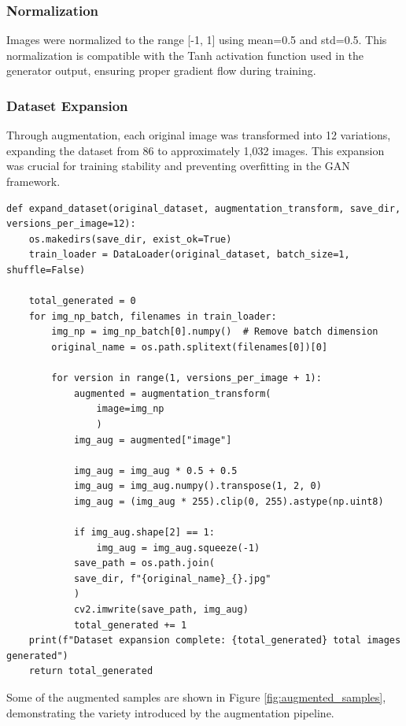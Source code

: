 \documentclass[a4paper, journal]{IEEEtran}
\begin{document}
\subsubsection{Normalization}
Images were normalized to the range [-1, 1] using mean=0.5 and std=0.5. This normalization is compatible with the Tanh activation function used in the generator output, ensuring proper gradient flow during training.

\subsubsection{Dataset Expansion}
Through augmentation, each original image was transformed into 12 variations, expanding the dataset from 86 to approximately 1,032 images. This expansion was crucial for training stability and preventing overfitting in the GAN framework.

\begin{lstlisting}[caption=Dataset Expansion Function]
def expand_dataset(original_dataset, augmentation_transform, save_dir, versions_per_image=12):
    os.makedirs(save_dir, exist_ok=True)
    train_loader = DataLoader(original_dataset, batch_size=1, shuffle=False)
    
    total_generated = 0
    for img_np_batch, filenames in train_loader:
        img_np = img_np_batch[0].numpy()  # Remove batch dimension
        original_name = os.path.splitext(filenames[0])[0]

        for version in range(1, versions_per_image + 1):
            augmented = augmentation_transform(
                image=img_np
                )
            img_aug = augmented["image"]

            img_aug = img_aug * 0.5 + 0.5
            img_aug = img_aug.numpy().transpose(1, 2, 0)  
            img_aug = (img_aug * 255).clip(0, 255).astype(np.uint8)

            if img_aug.shape[2] == 1:
                img_aug = img_aug.squeeze(-1)
            save_path = os.path.join(
            save_dir, f"{original_name}_{}.jpg"
            )
            cv2.imwrite(save_path, img_aug)
            total_generated += 1
    print(f"Dataset expansion complete: {total_generated} total images generated")
    return total_generated
\end{lstlisting}


Some of the augmented samples are shown in Figure \ref{fig:augmented_samples}, demonstrating the variety introduced by the augmentation pipeline.
\end{document}
